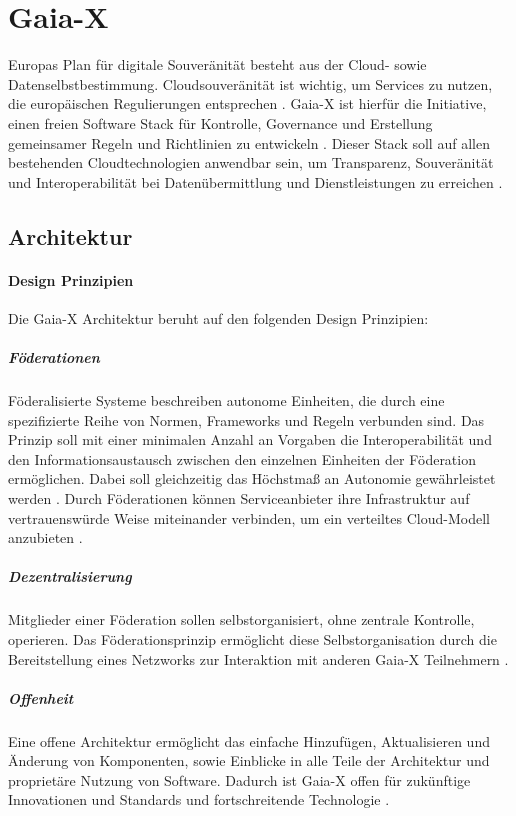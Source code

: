 \section{Gaia-X}
\label{sec:grundlagen:gaia-x}
Europas Plan für digitale Souveränität besteht aus der Cloud- sowie Datenselbstbestimmung.
Cloudsouveränität ist wichtig, um Services zu nutzen, die europäischen Regulierungen entsprechen \cite{Braud2021}.
Gaia-X ist hierfür die Initiative, einen freien Software Stack für Kontrolle, Governance und Erstellung gemeinsamer
Regeln und Richtlinien zu entwickeln \cite{Bonfiglio2021}. 
Dieser Stack soll auf allen bestehenden Cloudtechnologien anwendbar sein, um Transparenz, Souveränität und 
Interoperabilität bei Datenübermittlung und Dienstleistungen zu erreichen \cite{Bonfiglio2021}.

\subsection{Architektur}
\label{subsec:gaia-x:architektur}
\paragraph{Design Prinzipien}
Die Gaia-X Architektur beruht auf den folgenden Design Prinzipien:

\subparagraph{Föderationen}
Föderalisierte Systeme beschreiben autonome Einheiten, die durch eine spezifizierte Reihe von Normen,
Frameworks und Regeln verbunden sind.
Das Prinzip soll mit einer minimalen Anzahl an Vorgaben die Interoperabilität und den Informationsaustausch
zwischen den einzelnen Einheiten der Föderation ermöglichen. 
Dabei soll gleichzeitig das Höchstmaß an Autonomie gewährleistet werden \cite{GaiaXArchitecture2021}.
Durch Föderationen können Serviceanbieter ihre Infrastruktur auf vertrauenswürde Weise miteinander verbinden,
um ein verteiltes Cloud-Modell anzubieten \cite{Bonfiglio2021}.

\subparagraph{Dezentralisierung}
Mitglieder einer Föderation sollen selbstorganisiert, ohne zentrale Kontrolle, operieren.
Das Föderationsprinzip ermöglicht diese Selbstorganisation durch die Bereitstellung eines Netzworks
zur Interaktion mit anderen Gaia-X Teilnehmern \cite{GaiaXArchitecture2021}.

\subparagraph{Offenheit}
Eine offene Architektur ermöglicht das einfache Hinzufügen, Aktualisieren und Änderung von Komponenten, sowie
Einblicke in alle Teile der Architektur und proprietäre Nutzung von Software.
Dadurch ist Gaia-X offen für zukünftige Innovationen und Standards und fortschreitende Technologie \cite{GaiaXArchitecture2021}.

